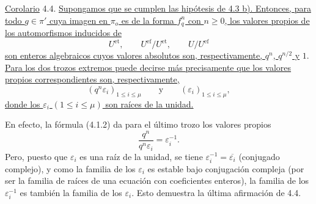 \medskip
\noindent
\underline{Corolario} 4.4. \underline{Supongamos que se cumplen las
hipótesis de 4.3 b). Entonces, para todo $g\in\pi'$ cuya imagen en
$\pi_o$ es de la forma $f_q^n$ con $n\geq0$, los valores propios de los
automorfismos inducidos de}
\[
 U^{\mathrm{et}},\qquad
 U^{\mathrm{ef}}/U^{\mathrm{et}},\qquad
 U/U^{\mathrm{ef}}
\]
\underline{son enteros algebraicos cuyos valores absolutos son,
respectivamente, $q^n$, $q^{n/2}$ y} $1$. \underline{Para los dos trozos extremos
puede decirse más precisamente que los valores propios correspondientes
son, respectivamente,}
\[
 (q^n\varepsilon_i)_{1\leq i\leq\mu}
 \qquad\text{y}\qquad
 (\varepsilon_i)_{1\leq i\leq\mu},
\]
\underline{donde los $\varepsilon_i$ $(1\leq i\leq\mu)$ son raíces de
la unidad.}

En efecto, la fórmula (4.1.2) da para el último trozo los valores propios
\[
 \frac{q^n}{q^n\varepsilon_i}=\varepsilon_i^{-1}.
\]
Pero, puesto que $\varepsilon_i$ es una raíz de la unidad, se tiene
$\varepsilon_i^{-1}=\overline{\varepsilon_i}$ (conjugado complejo), y
como la familia de los $\varepsilon_i$ es estable bajo conjugación
compleja (por ser la familia de raíces de una ecuación con coeficientes
enteros), la familia de los $\varepsilon_i^{-1}$ es también la familia
de los $\varepsilon_i$. Esto demuestra la última afirmación de 4.4.
